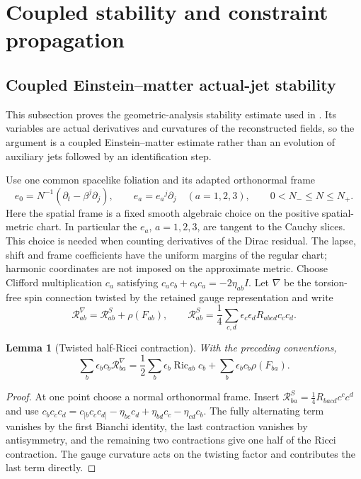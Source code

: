 \documentclass[11pt]{article}
\numberwithin{equation}{section}
\newtheorem{lemma}[lemma]{Lemma}
\theoremstyle{definition}
\theoremstyle{remark}
\newcommand{\Ric}{\operatorname{Ric}}
\begin{document}
\section{Coupled stability and constraint propagation}
\label{app:stability-package}

\subsection{Coupled Einstein--matter actual-jet stability}
\label{app:coupled-stability}

This subsection proves the geometric-analysis stability estimate used in .  Its variables are actual derivatives and curvatures of the reconstructed fields, so the argument is a coupled Einstein--matter estimate rather than an evolution of auxiliary jets followed by an identification step.

Use one common spacelike foliation and its adapted orthonormal frame
\begin{equation}
 e_0=N^{-1}(\partial_t-\beta^j\partial_j),\qquad
 e_a=e_a{}^j\partial_j\quad(a=1,2,3),\qquad 0<N_-\le N\le N_+.
 \label{eq:actual-jet-adapted-frame}
\end{equation}
Here the spatial frame is a fixed smooth algebraic choice on the positive
spatial-metric chart. In particular the $e_a$, $a=1,2,3$, are tangent to the
Cauchy slices. This choice is needed when counting derivatives of the Dirac
residual. The lapse, shift and frame coefficients have the uniform margins
of the regular chart; harmonic coordinates are not imposed on the approximate
metric. Choose Clifford multiplication $c_a$ satisfying
$c_ac_b+c_bc_a=-2\eta_{ab}I$. Let $\nabla$ be the torsion-free spin connection
twisted by the retained gauge representation and write
\[
 \mathcal R^\nabla_{ab}=\mathcal R^S_{ab}+\rho(F_{ab}),\qquad
 \mathcal R^S_{ab}=\frac14\sum_{c,d}\epsilon_c\epsilon_dR_{ab cd}c_cc_d.
\]

\begin{lemma}[Twisted half-Ricci contraction]
\label{lem:half-ricci}
With the preceding conventions,
\begin{equation}
 \sum_b\epsilon_b c_b\mathcal R^\nabla_{ba}
 =\frac12\sum_b\epsilon_b\Ric_{ab}c_b
 +\sum_b\epsilon_bc_b\rho(F_{ba}).
 \label{eq:half-ricci}
\end{equation}
\end{lemma}
\begin{proof}
At one point choose a normal orthonormal frame.  Insert
$\mathcal R^S_{ba}=\frac14R_{ba cd}c^cc^d$ and use
$c_bc_cc_d=c_{[b}c_cc_{d]}-\eta_{bc}c_d+\eta_{bd}c_c-\eta_{cd}c_b$.
The fully alternating term vanishes by the first Bianchi identity, the last contraction vanishes by antisymmetry, and the remaining two contractions give one half of the Ricci contraction.  The gauge curvature acts on the twisting factor and contributes the last term directly.
\end{proof}
\end{document}
